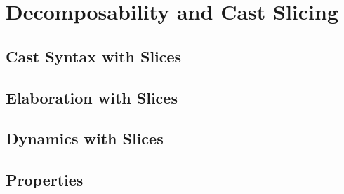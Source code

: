 \section{Decomposability and Cast Slicing}
\label{sec:decomposability}

\subsection{Cast Syntax with Slices}
\label{sec:cast-syntax}

\subsection{Elaboration with Slices}
\label{sec:elaboration-slices}

\subsection{Dynamics with Slices}
\label{sec:dynamics-slices}

\subsection{Properties}
\label{sec:cast-properties}

